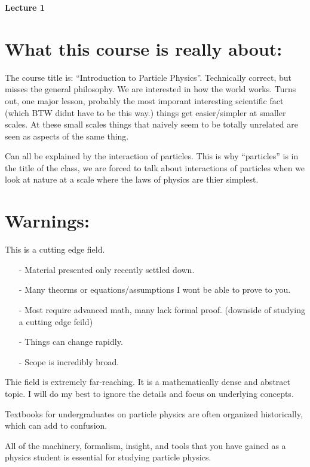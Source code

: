 
\usepackage{braket}

\def\ketY{\ensuremath{\ket {\Psi}}}
\def\iGeV{\ensuremath{\textrm{GeV}^{-1}}}


\textbf{\Huge Lecture 1}

\section{What this course is really about:}
The course title is: ``Introduction to Particle Physics''.
Technically correct, but misses the general philosophy. 
We are interested in how the world works. 
Turns out, one major lesson, probably the most imporant interesting scientific fact (which BTW didnt have to be this way.) things get easier/simpler at smaller scales. 
At these small scales things that naively seem to be totally unrelated are seen as aspects of the same thing. 

Can all be explained by the interaction of particles. 
This is why ``particles'' is in the title of the class, we are forced to talk about interactions of particles when we look at nature at a scale where the laws of physics are thier simplest. 

\section{Warnings:}
This is a cutting edge field. 
\begin{itemize}
\item[-] Material presented only recently settled down. 
\item[-] Many theorms or equations/assumptions I wont be able to prove to you. 
\item[-] Most require advanced math, many lack formal proof.  (downside of studying a cutting edge feild)
\item[-] Things can change rapidly. 
\item[-] Scope is incredibly broad. 
\end{itemize}

Thie field is extremely far-reaching. 
It is a mathematically dense and abstract topic. 
I will do my best to ignore the details and focus on underlying concepts.

Textbooks for undergraduates on particle physics are often organized historically, which can add to confusion. 

All of the machinery, formalism, insight, and tools that you have gained as a physics student is essential for studying particle physics.


